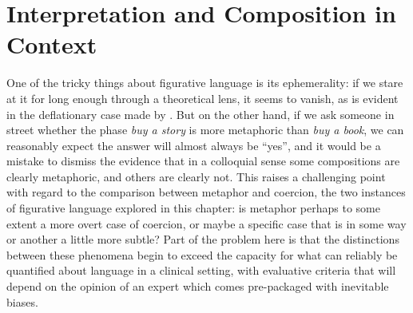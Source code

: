 
\section{Interpretation and Composition in Context} \label{sec:intercomp}
One of the tricky things about figurative language is its ephemerality: if we stare at it for long enough through a theoretical lens, it seems to vanish, as is evident in the deflationary case made by \cite{SperberEA2012}.  But on the other hand, if we ask someone in street whether the phase \emph{buy a story} is more metaphoric than \emph{buy a book}, we can reasonably expect the answer will almost always be ``yes'', and it would be a mistake to dismiss the evidence that in a colloquial sense some compositions are clearly metaphoric, and others are clearly not.  This raises a challenging point with regard to the comparison between metaphor and coercion, the two instances of figurative language explored in this chapter: is metaphor perhaps to some extent a more overt case of coercion, or maybe a specific case that is in some way or another a little more subtle?  Part of the problem here is that the distinctions between these phenomena begin to exceed the capacity for what can reliably be quantified about language in a clinical setting, with evaluative criteria that will depend on the opinion of an expert which comes pre-packaged with inevitable biases.

